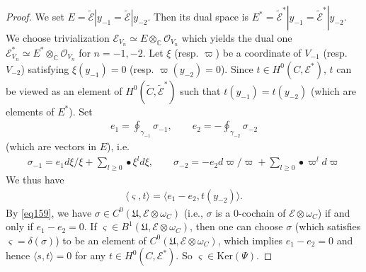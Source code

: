 \documentclass[12pt,b5paper,notitlepage]{report}
\theoremstyle{definition}
\theoremstyle{plain}
\newcommand{\fk}{\mathfrak}
\newcommand{\wtd}{\widetilde}
\newcommand{\bk}[1]{\langle {#1}\rangle}
\newcommand{\scr}{\mathscr}
\newcommand{\sgm}{\varsigma}
\newcommand{\blt}{\bullet}
\newcommand{\Cbb}{\mathbb C}
\newcommand{\Ker}{\mathrm{Ker}}
\numberwithin{equation}{section}
\begin{document}
\begin{proof}
We set $E=\wtd{\scr E}|y_{-1}=\wtd{\scr E}|y_{-2}$. Then its dual space is $E^*=\wtd{\scr E}^*|y_{-1}=\wtd{\scr E}^*|y_{-2}$. We choose trivialization $\scr E_{V_n}\simeq E\otimes_\Cbb\scr O_{V_n}$ which yields the dual one $\scr E^*_{V_n}\simeq E^*\otimes_\Cbb\scr O_{V_n}$ for $n=-1,-2$. Let $\xi$ (resp. $\varpi$) be a coordinate of $V_{-1}$ (resp. $V_{-2}$) satisfying $\xi(y_{-1})=0$ (resp. $\varpi(y_{-2})=0$). Since $t\in H^0(C,\scr E^*)$, $t$ can  be viewed as an element of $H^0(\wtd C,\wtd{\scr E}^*)$ such that $t(y_{-1})=t(y_{-2})$ (which are elements of $E^*$). Set 
\begin{align*}
e_1=\oint_{\gamma_{-1}}\sigma_{-1},\qquad e_2=-\oint_{\gamma_{-2}}\sigma_{-2}
\end{align*}
(which are vectors in $E$), i.e.
\begin{align}
\sigma_{-1}=e_1d\xi/\xi+\sum_{l\geq 0}\blt \xi^ld\xi,\qquad \sigma_{-2}=-e_2d\varpi/\varpi+\sum_{l\geq 0}\blt \varpi^ld\varpi \label{eq160}
\end{align}
We thus have
\begin{align}
\bk{\sgm,t}=\bk{e_1-e_2,t(y_{-2})}.\label{eq161}
\end{align}
By \eqref{eq159}, we have $\sigma\in C^0(\fk U,\scr E\otimes\omega_C)$ (i.e., $\sigma$ is a $0$-cochain of $\scr E\otimes\omega_C$) if and only if $e_1-e_2=0$. If $\sgm\in B^1(\fk U,\scr E\otimes\omega_C)$, then one can choose $\sigma$ (which satisfies $\sgm=\delta(\sigma)$) to be an element of $C^0(\fk U,\scr E\otimes\omega_C)$, which implies $e_1-e_2=0$ and hence $\bk{s,t}=0$ for any $t\in H^0(C,\scr E^*)$. So $\sgm\in\Ker(\Psi)$. 


\end{proof}
\end{document}
